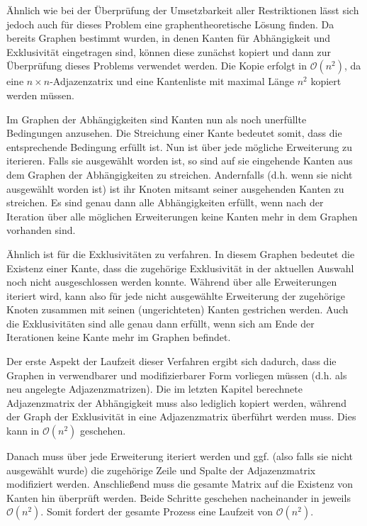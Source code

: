 Ähnlich wie bei der Überprüfung der Umsetzbarkeit aller Restriktionen lässt sich jedoch auch für dieses Problem eine graphentheoretische Lösung finden. Da bereits Graphen bestimmt wurden, in denen Kanten für Abhängigkeit und Exklusivität eingetragen sind, können diese zunächst kopiert und dann zur Überprüfung dieses Problems verwendet werden. Die Kopie erfolgt in $\mathcal{O}(n^2)$, da eine $n \times n$-Adjazenzatrix und eine Kantenliste mit maximal Länge $n^2$ kopiert werden müssen.

Im Graphen der Abhängigkeiten sind Kanten nun als noch unerfüllte Bedingungen anzusehen. Die Streichung einer Kante bedeutet somit, dass die entsprechende Bedingung erfüllt ist. Nun ist über jede mögliche Erweiterung zu iterieren. Falls sie ausgewählt worden ist, so sind auf sie eingehende Kanten aus dem Graphen der Abhängigkeiten zu streichen. Andernfalls (d.h. wenn sie nicht ausgewählt worden ist) ist ihr Knoten mitsamt seiner ausgehenden Kanten zu streichen. Es sind genau dann alle Abhängigkeiten erfüllt, wenn nach der Iteration über alle möglichen Erweiterungen keine Kanten mehr in dem Graphen vorhanden sind.

Ähnlich ist für die Exklusivitäten zu verfahren. In diesem Graphen bedeutet die Existenz einer Kante, dass die zugehörige Exklusivität in der aktuellen Auswahl noch nicht ausgeschlossen werden konnte. Während über alle Erweiterungen iteriert wird, kann also für jede nicht ausgewählte Erweiterung der zugehörige Knoten zusammen mit seinen (ungerichteten) Kanten gestrichen werden. Auch die Exklusivitäten sind alle genau dann erfüllt, wenn sich am Ende der Iterationen keine Kante mehr im Graphen befindet.

Der erste Aspekt der Laufzeit dieser Verfahren ergibt sich dadurch, dass die Graphen in verwendbarer und modifizierbarer Form vorliegen müssen (d.h. als neu angelegte Adjazenzmatrizen). Die im letzten Kapitel berechnete Adjazenzmatrix der Abhängigkeit muss also lediglich kopiert werden, während der Graph der Exklusivität in eine Adjazenzmatrix überführt werden muss. Dies kann in $\mathcal{O}(n^2)$ geschehen.

Danach muss über jede Erweiterung iteriert werden und ggf. (also falls sie nicht ausgewählt wurde) die zugehörige Zeile und Spalte der Adjazenzmatrix modifiziert werden. Anschließend muss die gesamte Matrix auf die Existenz von Kanten hin überprüft werden. Beide Schritte geschehen nacheinander in jeweils $\mathcal{O}(n^2)$. Somit fordert der gesamte Prozess eine Laufzeit von $\mathcal{O}(n^2)$.

